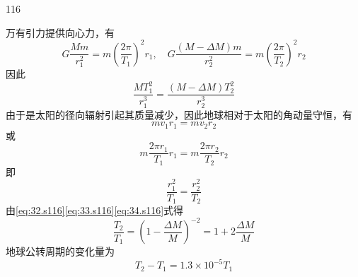 \begin{solution}{116}
\begin{subsolution}
\begin{subsubsolution}
        \end{subsubsolution}
        \begin{subsubsolution}
            万有引力提供向心力，有
            \begin{equation}
                G \frac{M m}{r_{1}^{2}} = m \left(\frac{2\pi}{T_{1}}\right)^{2} r_{1}, \quad G \frac{(M - \Delta M) m}{r_{2}^{2}} = m \left(\frac{2\pi}{T_{2}}\right)^{2} r_{2}
            \end{equation}
            因此
            \begin{equation}
                \frac{M T_{1}^{2}}{r_{1}^{3}} = \frac{(M - \Delta M) T_{2}^{2}}{r_{2}^{3}}
                \label{eq:33.s116}
            \end{equation}
            由于是太阳的径向辐射引起其质量减少，因此地球相对于太阳的角动量守恒，有
            \begin{equation}
                m v_{1} r_{1} = m v_{2} r_{2}
            \end{equation}
            或
            \begin{equation}
                m \frac{2\pi r_{1}}{T_{1}} r_{1} = m \frac{2\pi r_{2}}{T_{2}} r_{2}
            \end{equation}
            即
            \begin{equation}
                \frac{r_{1}^{2}}{T_{1}} = \frac{r_{2}^{2}}{T_{2}}
                \label{eq:34.s116}
            \end{equation}
            由\eqref{eq:32.s116}\eqref{eq:33.s116}\eqref{eq:34.s116}式得
            \begin{equation}
                \frac{T_{2}}{T_{1}} = \left(1 - \frac{\Delta M}{M}\right)^{-2} = 1 + 2 \frac{\Delta M}{M}
                \label{eq:35.s116}
            \end{equation}
            地球公转周期的变化量为
            \begin{equation}
                T_{2} - T_{1} = 1.3 \times 10^{-5} T_{1}
                \label{eq:36.s116}
            \end{equation}
        \end{subsubsolution}
    \end{subsolution}
\end{solution}